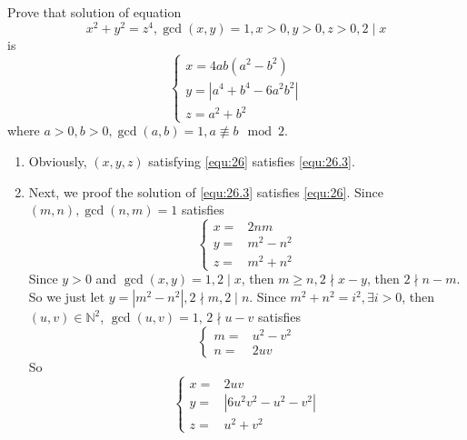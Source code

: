\documentclass{ctexart}
\newif\ifpreface
\begin{document}
\large
\setlength{\baselineskip}{1.2em}
\ifpreface

\else
{}
\begin{problem}\label{pro:p26.3}
  Prove that solution of equation
  \begin{equation}\label{equ:26.3}
    x^2 + y^2 = z^4,\gcd(x,y)=1,x>0,y>0,z>0,2 \mid x
  \end{equation}
  is
  \begin{equation}\label{equ:26}
    \begin{cases}
      x=4ab(a^2-b^2)      \\
      y=|a^4+b^4-6a^2b^2| \\
      z=a^2 + b^2
    \end{cases}
  \end{equation}
  where \(a>0,b>0,\gcd(a,b)=1,a \not \equiv b \mod 2\).
\end{problem}
\begin{solution}
  \begin{enumerate}
    \item Obviously, \((x,y,z)\) satisfying \ref{equ:26} satisfies \ref{equ:26.3}.
    \item Next, we proof the solution of \ref{equ:26.3} satisfies \ref{equ:26}. Since \((m,n), \gcd(n,m)=1\) satisfies
      \[\begin{cases}
          x = & 2nm       \\
          y=  & m^2-n^2   \\
          z=  & m^2 + n^2
        \end{cases}\]
      Since \(y >0\) and \(\gcd(x,y)=1, 2 \mid x\), then \(m \geq n, 2 \nmid x-y\), then \(2 \nmid n-m\). So we just let \(y=|m^2-n^2|, 2 \nmid m, 2 \mid n\).
      Since \(m^2 + n^2 =i^2, \exists i >0\), then \((u,v) \in \mathbb{N}^2\), \(\gcd(u,v)=1\), \(2 \nmid u-v\) satisfies
      \[
        \begin{cases}
          m = & u^2-v^2 \\
          n=  & 2uv
        \end{cases}
      \]
      So \[
        \begin{cases}
          x = & 2uv               \\
          y=  & |6u^2v^2-u^2-v^2| \\
          z=  & u^2 + v^2
        \end{cases}
      \]
  \end{enumerate}
\end{solution}
\end{document}
